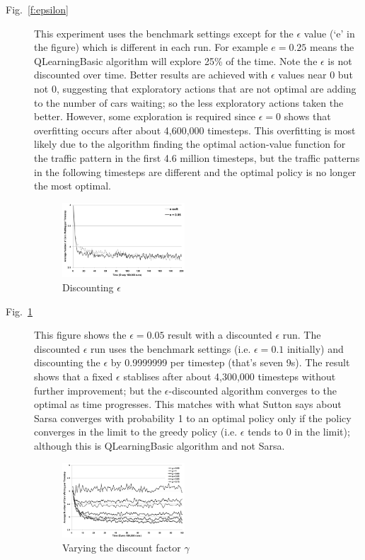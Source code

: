 \begin{description}
\item[Fig.~\ref{f:epsilon}]
This experiment uses the benchmark settings except for the $\epsilon$
value (`e' in the figure) which is different in each run. For example $e = 0.25$ means
the QLearningBasic algorithm will explore 25\% of the time.
Note the $\epsilon$ is not discounted over time.
Better results are achieved with $\epsilon$ values near 0 but not 0,
suggesting that exploratory actions
that are not optimal are adding to the number of cars waiting; so
the less exploratory actions taken the better. However, some exploration
is required since $\epsilon =0$ shows that overfitting occurs after
about 4,600,000 timesteps. This overfitting is most likely due to
the algorithm finding the optimal action-value function for the traffic
pattern in the first 4.6 million timesteps, but the traffic patterns
in the following timesteps are different and the optimal policy is
no longer the most optimal.

\begin{figure}
\centering
\includegraphics[width=0.45\textwidth]{e-soft}
\caption{Discounting $\epsilon$}\label{f:e-soft}
\end{figure}

\item[Fig.~\ref{f:e-soft}]
This figure shows the $\epsilon = 0.05$ result with a discounted
$\epsilon$ run. The discounted $\epsilon$ run uses the benchmark
settings (i.e. $\epsilon = 0.1$ initially) and discounting the
$\epsilon$ by 0.9999999 per timestep (that's seven 9s). The result shows
that a fixed $\epsilon$ stablises after about 4,300,000 timesteps
without further improvement; but the $\epsilon$-discounted algorithm
converges to the optimal as time progresses. This matches with what Sutton
\cite{sutton_rl_1998} says about Sarsa converges with probability
1 to an optimal policy only if the policy converges in the
limit to the greedy policy (i.e. $\epsilon$ tends to 0 in the limit);
although this is QLearningBasic algorithm and not Sarsa.

\begin{figure}
\centering
\includegraphics[width=0.45\textwidth]{discountFactor}
\caption{Varying the discount factor $\gamma$}\label{f:discountFactor}
\end{figure}


\end{description}
